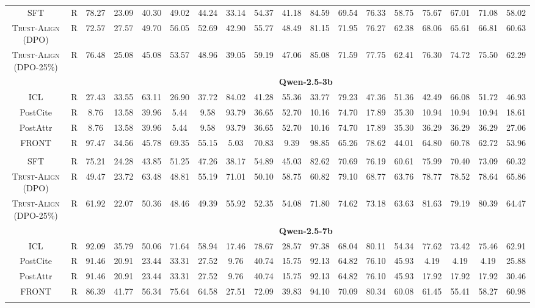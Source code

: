 \documentclass{article} %
\newcommand{\method}[0]{\textsc{Trust-Align}}
\begin{document}
\begin{table}[htb!]
{\begin{tabular}{ccc*{15}c}
SFT & R & 78.27 & 23.09 & 40.30 & 49.02 & 44.24 & 33.14 & 54.37 & 41.18 & 84.59 & 69.54 & 76.33 & 58.75 & 75.67 & 67.01 & 71.08 & 58.02 \\
\method{} (DPO) & R & 72.57 & 27.57 & 49.70 & 56.05 & 52.69 & 42.90 & 55.77 & 48.49 & 81.15 & 71.95 & 76.27 & 62.38 & 68.06 & 65.61 & 66.81 & 60.63 \\
\method{} (DPO-25\%) & R & 76.48 & 25.08 & 45.08 & 53.57 & 48.96 & 39.05 & 59.19 & 47.06 & 85.08 & 71.59 & 77.75 & 62.41 & 76.30 & 74.72 & 75.50 & 62.29 \\

& & \multicolumn{16}{c}{\cellcolor[gray]{0.9}\textbf{Qwen-2.5-3b}} \\
ICL & R & 27.43 & 33.55 & 63.11 & 26.90 & 37.72 & 84.02 & 41.28 & 55.36 & 33.77 & 79.23 & 47.36 & 51.36 & 42.49 & 66.08 & 51.72 & 46.93 \\
PostCite & R & 8.76 & 13.58 & 39.96 & 5.44 & 9.58 & 93.79 & 36.65 & 52.70 & 10.16 & 74.70 & 17.89 & 35.30 & 10.94 & 10.94 & 10.94 & 18.61 \\
PostAttr & R & 8.76 & 13.58 & 39.96 & 5.44 & 9.58 & 93.79 & 36.65 & 52.70 & 10.16 & 74.70 & 17.89 & 35.30 & 36.29 & 36.29 & 36.29 & 27.06 \\
FRONT & R & 97.47 & 34.56 & 45.78 & 69.35 & 55.15 & 5.03 & 70.83 & 9.39 & 98.85 & 65.26 & 78.62 & 44.01 & 64.80 & 60.78 & 62.72 & 53.96 \\\\

SFT & R & 75.21 & 24.28 & 43.85 & 51.25 & 47.26 & 38.17 & 54.89 & 45.03 & 82.62 & 70.69 & 76.19 & 60.61 & 75.99 & 70.40 & 73.09 & 60.32 \\
\method{} (DPO) & R & 49.47 & 23.72 & 63.48 & 48.81 & 55.19 & 71.01 & 50.10 & 58.75 & 60.82 & 79.10 & 68.77 & 63.76 & 78.77 & 78.52 & 78.64 & 65.86 \\
\method{} (DPO-25\%) & R & 61.92 & 22.07 & 50.36 & 48.46 & 49.39 & 55.92 & 52.35 & 54.08 & 71.80 & 74.62 & 73.18 & 63.63 & 81.63 & 79.19 & 80.39 & 64.47 \\

& & \multicolumn{16}{c}{\cellcolor[gray]{0.9}\textbf{Qwen-2.5-7b}} \\

ICL & R & 92.09 & 35.79 & 50.06 & 71.64 & 58.94 & 17.46 & 78.67 & 28.57 & 97.38 & 68.04 & 80.11 & 54.34 & 77.62 & 73.42 & 75.46 & 62.91 \\
PostCite & R & 91.46 & 20.91 & 23.44 & 33.31 & 27.52 & 9.76 & 40.74 & 15.75 & 92.13 & 64.82 & 76.10 & 45.93 & 4.19 & 4.19 & 4.19 & 25.88 \\
PostAttr & R & 91.46 & 20.91 & 23.44 & 33.31 & 27.52 & 9.76 & 40.74 & 15.75 & 92.13 & 64.82 & 76.10 & 45.93 & 17.92 & 17.92 & 17.92 & 30.46 \\
FRONT & R & 86.39 & 41.77 & 56.34 & 75.64 & 64.58 & 27.51 & 72.09 & 39.83 & 94.10 & 70.09 & 80.34 & 60.08 & 61.45 & 55.41 & 58.27 & 60.98 \\\\


\end{tabular}}
\end{table}
\end{document}
